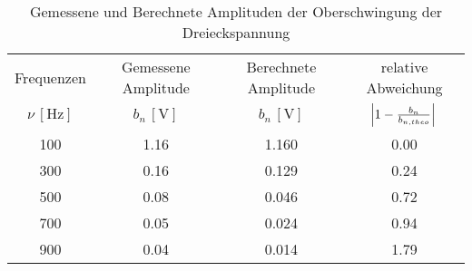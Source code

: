 \begin{table}[!h]
	\centering
	\begin{tabular}{|c|c|c|c|}
		\hline
		Frequenzen & Gemessene Amplitude & Berechnete Amplitude & relative Abweichung\\
		$\nu\,[\si{\hertz}]$ & $b_{n}\,[\si{\volt}]$ & $b_{n}\,[\si{\volt}]$ & $\envert{1 - \tfrac{b_{n}}{b_{n,theo}}}$\\\hline\hline
		\num{100}  & \num{1.16}  & \num{1.160}  & \num{0.00} \\
		\num{300}  & \num{0.16}  & \num{0.129}  & \num{0.24} \\
		\num{500}  & \num{0.08}  & \num{0.046}  & \num{0.72} \\
		\num{700}  & \num{0.05}  & \num{0.024}  & \num{0.94} \\
		\num{900}  & \num{0.04}  & \num{0.014}  & \num{1.79} \\
		\hline
	\end{tabular}
	\caption{Gemessene und Berechnete Amplituden der Oberschwingung der Dreieckspannung \label{tab:Analyse2}}
\end{table}